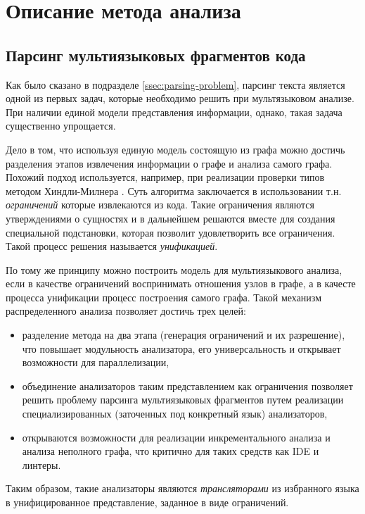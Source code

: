 \section{Описание метода анализа} \label{sec:architecture}

\subsection{Парсинг мультиязыковых фрагментов кода}

Как было сказано в подразделе \ref{ssec:parsing-problem}, парсинг текста является одной из первых
задач, которые необходимо решить при мультязыковом анализе. При наличии единой модели представления информации,
однако, такая задача существенно упрощается.

Дело в том, что используя единую модель состоящую из графа можно достичь разделения этапов
извлечения информации о графе и анализа самого графа. Похожий подход используется, например, при
реализации проверки типов методом Хиндли-Милнера \cite{algorithm-W}. Суть алгоритма заключается
в использовании т.н. \textit{ограничений} которые извлекаются из кода. Такие ограничения являются
утверждениями о сущностях и в дальнейшем решаются вместе для создания специальной подстановки, которая
позволит удовлетворить все ограничения. Такой процесс решения называется \textit{унификацией}.

По тому же принципу можно построить модель для мультиязыкового анализа, если в качестве ограничений
воспринимать отношения узлов в графе, а в качесте процесса унификации процесс построения самого графа. Такой
механизм распределенного анализа позволяет достичь трех целей:
\begin{itemize}
    \item разделение метода на два этапа (генерация ограничений и их разрешение), что повышает
    модульность анализатора, его универсальность и открывает возможности для параллелизации,
    \item объединение анализаторов таким представлением как ограничения позволяет решить проблему
    парсинга мультиязыковых фрагментов путем реализации специализированных (заточенных под конкретный
    язык) анализаторов,
    \item открываются возможности для реализации инкрементального анализа и анализа неполного графа, что
    критично для таких средств как IDE и линтеры.
\end{itemize}

Таким образом, такие анализаторы являются \textit{трансляторами} из избранного языка в унифицированное представление,
заданное в виде ограничений.

